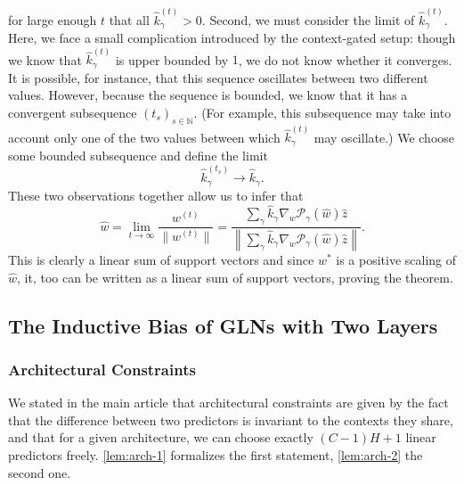 \documentclass{article}
\theoremstyle{plain}
\theoremstyle{definition}
\theoremstyle{remark}
\begin{document}
for large enough $t$ that all $\hat{k}_{\gamma}^{(t)}>0$.
Second, we must consider the limit of $\hat{k}_{\gamma}^{(t)}$.
Here, we face a small complication introduced by the context-gated setup: though we know that $\hat{k}_{\gamma}^{(t)}$ is upper bounded by $1$, we do not know whether it converges.
It is possible, for instance, that this sequence oscillates between two different values.
However, because the sequence is bounded, we know that it has a convergent subsequence $(t_s)_{s\in\mathbb{N}}$.
(For example, this subsequence may take into account only one of the two values between which $\hat{k}_{\gamma}^{(t)}$ may oscillate.)
We choose some bounded subsequence and define the limit
\begin{equation}
    \hat{k}_{\gamma}^{(t_s)}\to\hat{k}_{\gamma}.
\end{equation}
These two observations together allow us to infer that
\begin{equation}
    \hat{w}=\lim_{t\to\infty}\frac{w^{(t)}}{\|w^{(t)}\|}=\frac{\sum_{\gamma}\hat{k}_{\gamma}\nabla_w\mathcal{P}_{\gamma}(\hat{w})\hat{z}}
    {\left\|\sum_{\gamma}\hat{k}_{\gamma}\nabla_w\mathcal{P}_{\gamma}(\hat{w})\hat{z}\right\|}.
\end{equation}
This is clearly a linear sum of support vectors and since $w^{\ast}$ is a positive scaling of $\hat{w}$, it, too can be written as a linear sum of support vectors, proving the theorem.

\subsection{The Inductive Bias of GLNs with Two Layers}
\label{app:special-case}

\subsubsection{Architectural Constraints}
\label{app:special-case-arch}

We stated in the main article that architectural constraints are given by the fact that the difference between two predictors is invariant to the contexts they share, and that for a given architecture, we can choose exactly $(C-1)H+1$ linear predictors freely.
\cref{lem:arch-1} formalizes the first statement, \cref{lem:arch-2} the second one.
\end{document}
